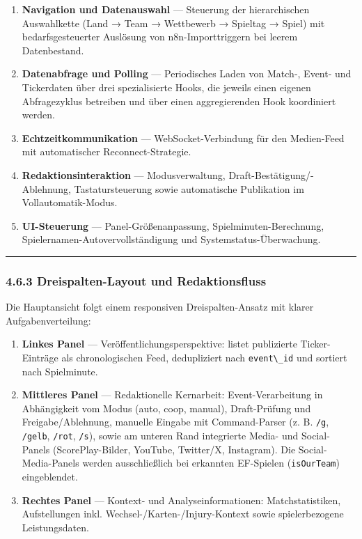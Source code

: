 \begin{enumerate}
\def\labelenumi{\arabic{enumi}.}
\tightlist
\item
  \textbf{Navigation und Datenauswahl} --- Steuerung der hierarchischen
  Auswahlkette (Land → Team → Wettbewerb → Spieltag → Spiel) mit
  bedarfsgesteuerter Auslösung von n8n-Importtriggern bei leerem
  Datenbestand.
\item
  \textbf{Datenabfrage und Polling} --- Periodisches Laden von Match-,
  Event- und Tickerdaten über drei spezialisierte Hooks, die jeweils
  einen eigenen Abfragezyklus betreiben und über einen aggregierenden
  Hook koordiniert werden.
\item
  \textbf{Echtzeitkommunikation} --- WebSocket-Verbindung für den
  Medien-Feed mit automatischer Reconnect-Strategie.
\item
  \textbf{Redaktionsinteraktion} --- Modusverwaltung,
  Draft-Bestätigung/-Ablehnung, Tastatursteuerung sowie automatische
  Publikation im Vollautomatik-Modus.
\item
  \textbf{UI-Steuerung} --- Panel-Größenanpassung,
  Spielminuten-Berechnung, Spielernamen-Autovervollständigung und
  Systemstatus-Überwachung.
\end{enumerate}

\begin{center}\rule{0.5\linewidth}{0.5pt}\end{center}

\subsubsection{4.6.3 Dreispalten-Layout und
Redaktionsfluss}\label{dreispalten-layout-und-redaktionsfluss}

Die Hauptansicht folgt einem responsiven Dreispalten-Ansatz mit klarer
Aufgabenverteilung:

\begin{enumerate}
\def\labelenumi{\arabic{enumi}.}
\tightlist
\item
  \textbf{Linkes Panel} --- Veröffentlichungsperspektive: listet
  publizierte Ticker-Einträge als chronologischen Feed, dedupliziert
  nach \passthrough{\lstinline!event\_id!} und sortiert nach
  Spielminute.
\item
  \textbf{Mittleres Panel} --- Redaktionelle Kernarbeit:
  Event-Verarbeitung in Abhängigkeit vom Modus (auto, coop, manual),
  Draft-Prüfung und Freigabe/Ablehnung, manuelle Eingabe mit
  Command-Parser (z. B. \passthrough{\lstinline!/g!},
  \passthrough{\lstinline!/gelb!}, \passthrough{\lstinline!/rot!},
  \passthrough{\lstinline!/s!}), sowie am unteren Rand integrierte
  Media- und Social-Panels (ScorePlay-Bilder, YouTube, Twitter/X,
  Instagram). Die Social-Media-Panels werden ausschließlich bei
  erkannten EF-Spielen (\passthrough{\lstinline!isOurTeam!})
  eingeblendet.
\item
  \textbf{Rechtes Panel} --- Kontext- und Analyseinformationen:
  Matchstatistiken, Aufstellungen inkl. Wechsel-/Karten-/Injury-Kontext
  sowie spielerbezogene Leistungsdaten.
\end{enumerate}

